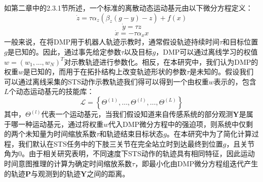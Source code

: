 如第二章中的2.3.1节所述，一个标准的离散动态运动基元由以下微分方程定义：
\begin{equation}
    \dot{z}=\tau \alpha_z\left(\beta_z(g-y)-z\right)+f(x)
    \label{eq:4-3}
\end{equation}
\begin{equation}
    \dot{y}=\tau z 
    \label{eq:4-4}
\end{equation}
\begin{equation}
    \dot{x}=-\tau \alpha_x x
    \label{eq:4-5}
\end{equation}
一般来说，在将DMP用于机器人轨迹示教时，通常假设轨迹持续时间$τ$和目标位置$g$是已知的。因此，通过事先给定参数$τ$以及目标$g$，DMP可以通过离线学习的权值$w=(w_1,...,w_N)^T$对示教轨迹进行参数化。相反，在本研究中，我们认为DMP的权重$w$是已知的，而用于在拓扑结构上改变轨迹形状的参数$\tau$是未知的。假设我们可以通过离线采集的STS动作示教轨迹我们得可以得到一个由权重$w$表示的，包含$L$个动态运动基元的技能库：
\begin{equation}
    \mathscr{L}=\left\{\Theta^{(1)}, \ldots, \Theta^{(l)}, \ldots, \Theta^{(L)}\right\}
\end{equation}
其中，$\Theta^{(l)}$代表一个运动基元，当我们假设知道来自传感系统的部分观测$\mathbf{Y}$是属于哪一种运动基元，通过将权重$w$代入DMP微分方程中的强迫项，则系统中仅剩的两个未知量为时间缩放系数$\tau$和轨迹结束目标状态$g$。在本研究中为了简化计算过程，我们默认在STS任务中的下肢三关节在完全站立时到达最终到位置$g$，且关节角为0。由于相关研究表明，不同速度下STS动作的轨迹具有相同特征，因此运动时间意图推理的计算为确定时间缩放系数$\tau$，即最小化由DMP微分方程组迭代产生的轨迹$\mathbf{P}$与观测到的轨迹$\mathbf{Y}$之间的距离。

